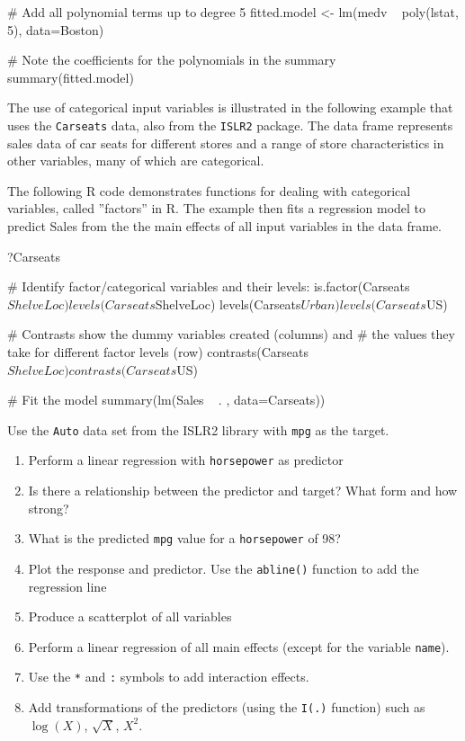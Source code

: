 \begin{withcode}
\begin{Rcode}
# Add all polynomial terms up to degree 5
fitted.model <- lm(medv ~ poly(lstat, 5), data=Boston)

# Note the coefficients for the polynomials in the summary
summary(fitted.model)
\end{Rcode}

The use of categorical input variables is illustrated in the following example that uses the \texttt{Carseats} data, also from the \texttt{ISLR2} package. The data frame represents sales data of car seats for different stores and a range of store characteristics in other variables, many of which are categorical. 

The following R code demonstrates functions for dealing with categorical variables, called ''factors'' in R. The example then fits a regression model to predict Sales from the the main effects of all input variables in the data frame.

\begin{Rcode}
?Carseats

# Identify factor/categorical variables and their levels:
is.factor(Carseats$ShelveLoc)
levels(Carseats$ShelveLoc)
levels(Carseats$Urban)
levels(Carseats$US)

# Contrasts show the dummy variables created (columns) and 
# the values they take for different  factor levels (row)
contrasts(Carseats$ShelveLoc)
contrasts(Carseats$US)

# Fit the model
summary(lm(Sales ~ . , data=Carseats))
\end{Rcode}

\begin{exerciseboxcomputer}
\noindent Use the \texttt{Auto} data set from the ISLR2 library with \texttt{mpg} as the target.
  \begin{enumerate}
     \item Perform a linear regression with \texttt{horsepower} as predictor
     \item Is there a relationship between the predictor and target? What form and how strong?
     \item What is the predicted \texttt{mpg} value for a \texttt{horsepower} of 98? 
     \item Plot the response and predictor. Use the \texttt{abline()} function to add the regression line
     \item Produce a scatterplot of all variables
     \item Perform a linear regression of all main effects (except for the variable \texttt{name}).
     \item Use the \texttt{*} and \texttt{:} symbols to add interaction effects.
     \item Add transformations of the predictors (using the \texttt{I(.)} function) such as $\log(X)$, $\sqrt{X}$, $X^2$.
  \end{enumerate}


\end{exerciseboxcomputer}
\end{withcode}
